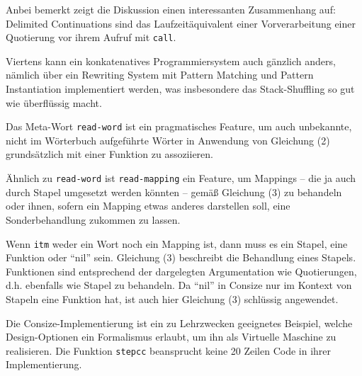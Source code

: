 Anbei bemerkt zeigt die Diskussion einen interessanten Zusammenhang auf: Delimited Continuations sind das Laufzeitäquivalent einer Vorverarbeitung einer Quotierung vor ihrem Aufruf mit \verb|call|.

Viertens kann ein konkatenatives Programmiersystem auch gänzlich anders, nämlich über ein Rewriting System mit Pattern Matching und Pattern Instantiation implementiert werden,
was insbesondere das Stack-Shuffling so gut wie überflüssig macht.

Das Meta-Wort \verb|read-word| ist ein pragmatisches Feature, um auch unbekannte, nicht im Wörterbuch aufgeführte Wörter in Anwendung von Gleichung (2) grundsätzlich mit einer Funktion zu assoziieren. 

\smallskip{}
Ähnlich zu \verb|read-word| ist \verb|read-mapping| ein Feature, um Mappings -- die ja auch durch Stapel umgesetzt werden könnten -- gemäß Gleichung (3) zu behandeln oder ihnen, sofern ein Mapping etwas anderes darstellen soll, eine Sonderbehandlung zukommen zu lassen.

\smallskip{}
Wenn \verb|itm| weder ein Wort noch ein Mapping ist, dann muss es ein Stapel, eine Funktion oder "`nil"' sein. Gleichung (3) beschreibt die Behandlung eines Stapels. Funktionen sind entsprechend der dargelegten Argumentation wie Quotierungen, d.h. ebenfalls wie Stapel zu behandeln. Da "`nil"' in Consize nur im Kontext von Stapeln eine Funktion hat, ist auch hier Gleichung (3) schlüssig angewendet.

\smallskip\noindent Die Consize-Implementierung ist ein zu Lehrzwecken geeignetes Beispiel, welche Design-Optionen ein Formalismus erlaubt, um ihn als Virtuelle Maschine zu realisieren. Die Funktion \verb|stepcc| beansprucht keine 20 Zeilen Code in ihrer Implementierung. 


